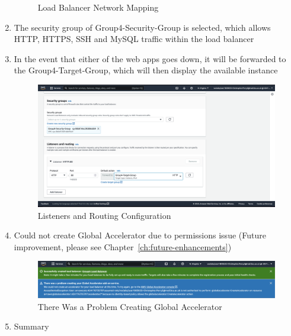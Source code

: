 \begin{enumerate}
\begin{figure}[H]
	      \caption{Load Balancer Network Mapping}
	      \label{fig:elb-networ-mapping}
	\end{figure}
	\item The security group of Group4-Security-Group is selected, which allows HTTP, HTTPS, SSH and MySQL traffic within
	      the load balancer
	\item In the event that either of the web apps goes down, it will be forwarded to the Group4-Target-Group, which will then
	      display the available instance \begin{figure}[H]
	      \centering
	      \includegraphics[width=\textwidth]{resources/elb/elb-security-groups-and-listeners.png}
	      \caption{Listeners and Routing Configuration}
	      \label{fig:elb-security-groups}
	\end{figure}
	\item Could not create Global Accelerator due to permissions issue (Future improvement, please see Chapter~\ref{ch:future-enhancements})
	      \begin{figure}[H]
	      	\centering
	      	\includegraphics[width=\textwidth]{resources/elb/elb-accelerator.png}
	      	\caption{There Was a Problem Creating Global Accelerator}
	      	\label{fig:elb-accelerators}
	      \end{figure}
	\item Summary


\end{enumerate}
